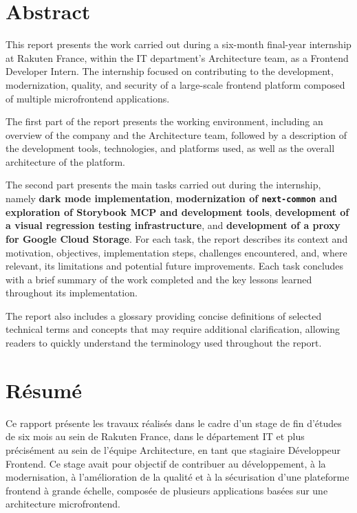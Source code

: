 \chapter*{Abstract}


This report presents the work carried out during a six-month final-year internship at Rakuten France, within the IT department's Architecture team, as a Frontend Developer Intern. The internship focused on contributing to the development, modernization, quality, and security of a large-scale frontend platform composed of multiple microfrontend applications.

The first part of the report presents the working environment, including an overview of the company and the Architecture team, followed by a description of the development tools, technologies, and platforms used, as well as the overall architecture of the platform.

The second part presents the main tasks carried out during the internship, namely \textbf{dark mode implementation}, \textbf{modernization of \texttt{next-common} and exploration of Storybook MCP and development tools}, \textbf{development of a visual regression testing infrastructure}, and \textbf{development of a proxy for Google Cloud Storage}. For each task, the report describes its context and motivation, objectives, implementation steps, challenges encountered, and, where relevant, its limitations and potential future improvements. Each task concludes with a brief summary of the work completed and the key lessons learned throughout its implementation.

The report also includes a glossary providing concise definitions of selected technical terms and concepts that may require additional clarification, allowing readers to quickly understand the terminology used throughout the report.

\chapter*{Résumé}

Ce rapport présente les travaux réalisés dans le cadre d'un stage de fin d'études de six mois au sein de Rakuten France, dans le département IT et plus précisément au sein de l'équipe Architecture, en tant que stagiaire Développeur Frontend. Ce stage avait pour objectif de contribuer au développement, à la modernisation, à l'amélioration de la qualité et à la sécurisation d'une plateforme frontend à grande échelle, composée de plusieurs applications basées sur une architecture microfrontend.


